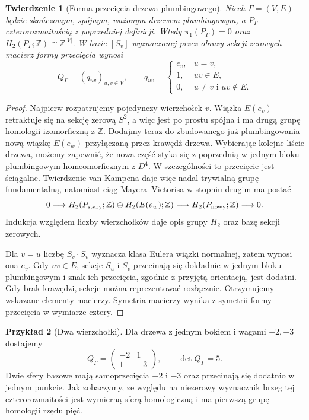 \documentclass[11pt,a4paper]{report}
\numberwithin{equation}{section}
\theoremstyle{plain}
\newtheorem{twierdzenie}{Twierdzenie}[section]
\theoremstyle{definition}
\newtheorem{przyklad}[twierdzenie]{Przykład}
\theoremstyle{remark}
\begin{document}
\begin{twierdzenie}[Forma przecięcia drzewa plumbingowego]
\label{thm:tg-plumbing-intersection}
Niech $\Gamma=(V,E)$ będzie skończonym, spójnym, ważonym
drzewem plumbingowym, a $P_\Gamma$ czterorozmaitością
z poprzedniej definicji. Wtedy $\pi_1(P_\Gamma)=0$ oraz
$H_2(P_\Gamma;\mathbb Z)\cong\mathbb Z^{|V|}$.
W bazie $[S_v]$ wyznaczonej przez obrazy sekcji zerowych
macierz formy przecięcia wynosi
\[
Q_\Gamma=(q_{uv})_{u,v\in V},\qquad
q_{uv}=\begin{cases}
e_v,&u=v,\\
1,&uv\in E,\\
0,&u\ne v\text{ i }uv\notin E.
\end{cases}
\]
\end{twierdzenie}

\begin{proof}
Najpierw rozpatrujemy pojedynczy wierzchołek $v$.
Wiązka $E(e_v)$ retraktuje się na sekcję zerową $S^2$,
a więc jest po prostu spójna i ma drugą grupę homologii
izomorficzną z $\mathbb Z$. Dodajmy teraz do zbudowanego
już plumbingowania nową wiązkę $E(e_w)$ przyłączaną
przez krawędź drzewa. Wybierając kolejne liście drzewa,
możemy zapewnić, że nowa część styka się z poprzednią
w jednym bloku plumbingowym homeomorficznym z $D^4$.
W szczególności to przecięcie jest ściągalne.
Twierdzenie van Kampena daje więc nadal trywialną grupę
fundamentalną, natomiast ciąg Mayera--Vietorisa w stopniu
drugim ma postać
\[
0\longrightarrow H_2(P_{\rm stary};\mathbb Z)\oplus
H_2(E(e_w);\mathbb Z)\longrightarrow
H_2(P_{\rm nowy};\mathbb Z)\longrightarrow0.
\]
Indukcja względem liczby wierzchołków daje opis grupy
$H_2$ oraz bazę sekcji zerowych.

Dla $v=u$ liczbę $S_v\cdot S_v$ wyznacza klasa Eulera
wiązki normalnej, zatem wynosi ona $e_v$. Gdy $uv\in E$,
sekcje $S_u$ i $S_v$ przecinają się dokładnie w jednym
bloku plumbingowym i znak ich przecięcia, zgodnie z
przyjętą orientacją, jest dodatni. Gdy brak krawędzi,
sekcje można reprezentować rozłącznie. Otrzymujemy
wskazane elementy macierzy. Symetria macierzy wynika
z symetrii formy przecięcia w wymiarze cztery.
\end{proof}

\begin{przyklad}[Dwa wierzchołki]
Dla drzewa z jednym bokiem i wagami $-2,-3$ dostajemy
\[
Q_\Gamma=\begin{pmatrix}-2&1\\1&-3\end{pmatrix},
\qquad \det Q_\Gamma=5.
\]
Dwie sfery bazowe mają samoprzecięcia $-2$ i $-3$ oraz
przecinają się dodatnio w jednym punkcie. Jak zobaczymy,
ze względu na niezerowy wyznacznik brzeg tej czterorozmaitości
jest wymierną sferą homologiczną i ma pierwszą grupę homologii
rzędu pięć.
\end{przyklad}
\end{document}
